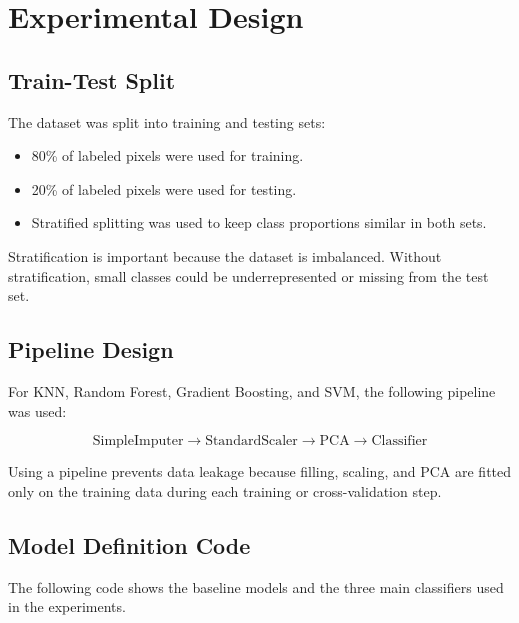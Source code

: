 \documentclass[12pt,a4paper]{article}
\begin{document}
\section{Experimental Design}

\subsection{Train-Test Split}

The dataset was split into training and testing sets:

\begin{itemize}
    \item 80\% of labeled pixels were used for training.
    \item 20\% of labeled pixels were used for testing.
    \item Stratified splitting was used to keep class proportions similar in both sets.
\end{itemize}

Stratification is important because the dataset is imbalanced. Without stratification, small classes could be underrepresented or missing from the test set.

\subsection{Pipeline Design}

For KNN, Random Forest, Gradient Boosting, and SVM, the following pipeline was used:

\[
\text{SimpleImputer} \rightarrow \text{StandardScaler} \rightarrow \text{PCA} \rightarrow \text{Classifier}
\]

Using a pipeline prevents data leakage because filling, scaling, and PCA are fitted only on the training data during each training or cross-validation step.

\subsection{Model Definition Code}

The following code shows the baseline models and the three main classifiers used in the experiments.
\end{document}
